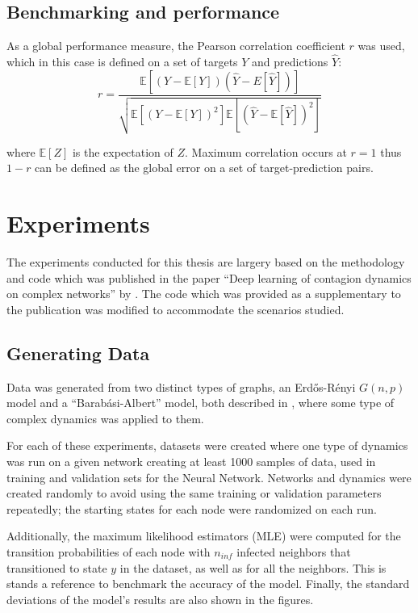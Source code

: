 \subsection{Benchmarking and performance}

As a global performance measure, the Pearson correlation coefficient $r$
was used, which in this case is defined on a set of targets $Y$ and predictions $\hat{Y}$:
\begin{equation}
  \label{eq:pearson}
  r = \frac{\mathbb{E}[(Y - \mathbb{E}[Y])(\hat{Y} - E[\hat{Y}])]}{\sqrt{
      \mathbb{E}[(Y - \mathbb{E}[Y])^2]\mathbb{E}[(\hat{Y} - \mathbb{E}[\hat{Y}])^2]}}
\end{equation}

where $\mathbb{E}[Z]$ is the expectation of $Z$. Maximum correlation occurs at
$r=1$ thus $1-r$ can be defined as the global error on a set of target-prediction
pairs.

\section{Experiments}\label{sec:exps}
The experiments conducted for this thesis are largery based on the
methodology and code which was published in the paper ``Deep learning
of contagion dynamics on complex networks'' by \citet{murphy}. The code
which was provided as a supplementary to the publication was modified to
accommodate the scenarios studied. 

\subsection{Generating Data}
Data was generated from two distinct types of graphs, an Erd{\H{o}}s-R{\'e}nyi
$G(n, p)$ model and a ``Barab{\'a}si-Albert'' model, both described in ,
where some type of complex dynamics was applied to them. 

For each of these experiments, datasets were created where one type of dynamics
was run on a given network creating at least 1000 samples of data, used in
training and validation sets for the Neural Network. Networks and dynamics were
created randomly to avoid using the same training or validation parameters repeatedly;
the starting states for each node were randomized on each run.

Additionally, the maximum likelihood estimators (MLE) were computed
for the transition probabilities of each node with $n_{inf}$ infected
neighbors that transitioned to state $y$ in the dataset, as well as
for all the neighbors. This is stands a reference to benchmark the
accuracy of the model. Finally, the standard deviations of the model's
results are also shown in the figures.


